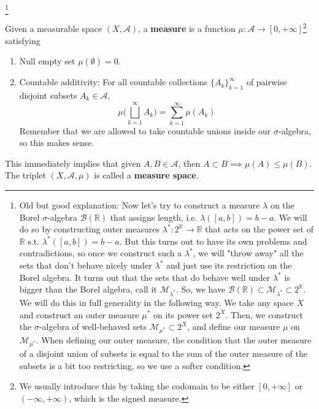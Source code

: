   \footnote{Old but good explanation: Now let's try to construct a measure $\lambda$ on the Borel $\sigma$-algebra $\mathcal{B}(\mathbb{R})$ that assigns length, i.e. $\lambda([a, b]) = b - a$. We will do so by constructing outer measures $\lambda^*: 2^\mathbb{R} \longrightarrow \mathbb{R}$ that acts on the power set of $\mathbb{R}$ s.t. $\lambda^*([a, b]) = b - a$. But this turns out to have its own problems and contradictions, so once we construct such a $\lambda^*$, we will "throw away" all the sets that don't behave nicely under $\lambda^*$ and just use its restriction on the Borel algebra. It turns out that the sets that do behave well under $\lambda^*$ is bigger than the Borel algebra, call it $\mathcal{M}_{\lambda^*}$. So, we have $\mathcal{B}(\mathbb{R}) \subset \mathcal{M}_{\lambda^*} \subset 2^\mathbb{R}$. We will do this in full generality in the following way. We take any space $X$ and construct an outer measure $\mu^*$ on its power set $2^X$. Then, we construct the $\sigma$-algebra of well-behaved sets $\mathcal{M}_{\mu^*} \subset 2^X$, and define our measure $\mu$ on $\mathcal{M}_{\mu^*}$. When defining our outer measure, the condition that the outer measure of a disjoint union of subsets is equal to the sum of the outer measure of the subsets is a bit too restricting, so we use a softer condition. }

  \begin{definition}[Measure]
    Given a measurable space $(X, \mathcal{A})$, a \textbf{measure} is a function $\mu : \mathcal{A} \longrightarrow [0, +\infty]$\footnote{We usually introduce this by taking the codomain to be either $[0, +\infty]$ or $(-\infty, +\infty)$, which is the signed measure.} satisfying 
    \begin{enumerate}
      \item Null empty set $\mu(\emptyset) = 0$. 
      \item Countable additivity: 
        For all countable collections $\{A_k\}_{k=1}^\infty$ of pairwise disjoint subsets $A_k \in \mathcal{A}$, 
      \begin{equation}
        \mu \bigg( \bigsqcup_{k=1}^\infty A_k \bigg) = \sum_{k=1}^\infty \mu(A_k)
      \end{equation}
      Remember that we are allowed to take countable unions inside our $\sigma$-algebra, so this makes sense. 
    \end{enumerate}
    This immediately implies that given $A, B \in \mathcal{A}$, then $A \subset B \implies \mu(A) \leq \mu(B)$. The triplet $(X, \mathcal{A}, \mu)$ is called a \textbf{measure space}. 
  \end{definition}

